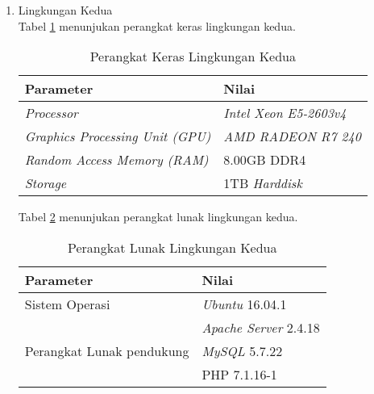 \begin{enumerate}
	\item Lingkungan Kedua\\
	Tabel \ref{tab:lingkunganpkpe} menunjukan perangkat keras lingkungan kedua.
	\begin{table}[H] %
		\caption{Perangkat Keras Lingkungan Kedua}
		\centering
		\label{tab:lingkunganpkpe}
		\begin{tabular}{|l|l|}
			\hline
			\textbf{Parameter} & \textbf{Nilai} \\
			\hline
			\textit{Processor} & \textit{Intel Xeon E5-2603v4}\\
			\hline
			\textit{Graphics Processing Unit (GPU)} & \textit{AMD RADEON R7 240}\\
			\hline
			\textit{Random Access Memory (RAM)}& 8.00GB DDR4\\
			\hline
			\textit{Storage} & 1TB \textit{Harddisk}\\
			\hline
		\end{tabular}%
	\end{table}
	
	Tabel \ref{tab:lingkunganplpe} menunjukan perangkat lunak lingkungan kedua.
	\begin{table}[h] %
		\caption{Perangkat Lunak Lingkungan Kedua}
		\label{tab:lingkunganplpe}
		\centering
		\begin{tabular}{|l|l|}
			\hline
			\textbf{Parameter} & \textbf{Nilai} \\
			\hline
			Sistem Operasi & \textit{Ubuntu} 16.04.1\\
			\hline
			\multirow{4}{*}{Perangkat Lunak pendukung} 	& \textit{Apache Server} 2.4.18\\
			& \textit{MySQL} 5.7.22\\
			& PHP 7.1.16-1\\
			\hline
		\end{tabular}%
	\end{table}
\end{enumerate}


